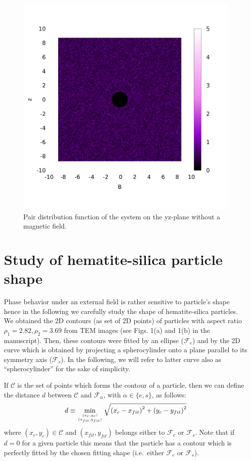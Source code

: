 \documentclass[aip,graphicx]{revtex4-1} %
\def\ontop#1#2{\genfrac{}{}{0pt}{}{#1}{#2}}
\begin{document}
\begin{figure}
    \centering
    \includegraphics[width=0.5\columnwidth]{gyz_noB.png}
    \caption{Pair distribution function of the system on the yz-plane without a magnetic field.}\label{fig:gyz_noB}
\end{figure}


\section{Study of hematite-silica particle shape}
Phase behavior under an external field is rather sensitive to particle's shape hence in the following
we carefully study the shape of hematite-silica particles.
We obtained the 2D contours (as set of 2D points) of particles with aspect ratio $\rho_1 = 2.82, \rho_2 = 3.69$ from TEM images 
(see Figs. 1(a) and 1(b) in the manuscript).
Then, these contours were fitted by an ellipse ($\mathcal{F}_{e}$) and by the 2D curve which is obtained by projecting a spherocylinder 
onto a plane parallel to its symmetry axis ($\mathcal{F}_{s}$). In the following, we will refer to latter curve also as 
``spherocylinder'' for the sake of simplicity.

If $\mathcal{C}$ is the set of points which forms the contour of a particle, then we can define the distance $d$ between
$\mathcal{C}$ and $\mathcal{F}_\alpha$, with $\alpha\in\{e,s\}$, as follows:
\begin{equation}
  d \equiv \min_{\ontop{(x_c,y_c)}{(x_{fit}, y_{fit})}} \sqrt{{(x_c - x_{fit})}^2 + {(y_c - y_{fit})}^2}\label{eq:distdef}
\end{equation}
where $(x_c,y_c)\in \mathcal{C}$ and $(x_{fit},y_{fit})$ belongs either to $\mathcal{F}_e$ or $\mathcal{F}_s$.
Note that if $d=0$ for a given particle this means that the particle has a contour which is perfectly fitted
by the chosen fitting shape (i.e.~either $\mathcal{F}_e$ or $\mathcal{F}_s$).
\end{document}
